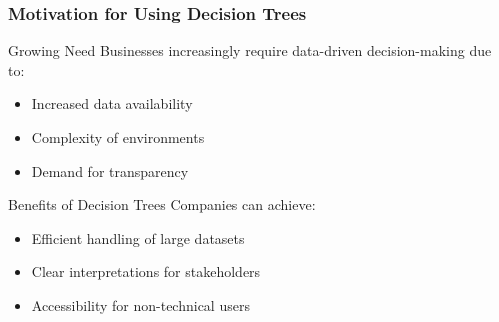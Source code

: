 \documentclass[aspectratio=169]{beamer}
\begin{document}
\begin{frame}[fragile]
    \frametitle{Motivation for Using Decision Trees}
    \begin{block}{Growing Need}
        Businesses increasingly require data-driven decision-making due to:
        \begin{itemize}
            \item Increased data availability
            \item Complexity of environments
            \item Demand for transparency
        \end{itemize}
    \end{block}
    
    \begin{block}{Benefits of Decision Trees}
        Companies can achieve:
        \begin{itemize}
            \item Efficient handling of large datasets
            \item Clear interpretations for stakeholders
            \item Accessibility for non-technical users
        \end{itemize}
    \end{block}
\end{frame}
\end{document}
